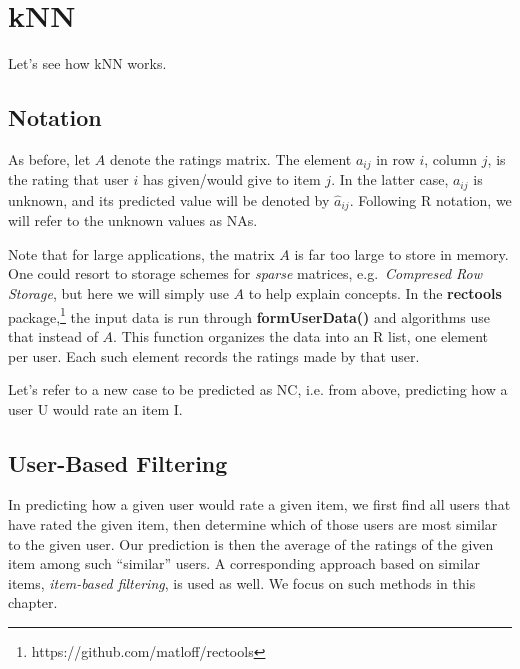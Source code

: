 \section{kNN}

Let's see how kNN works.

\subsection{Notation}

As before, let $A$ denote the ratings matrix.  The element $a_{ij}$ in
row $i$, column $j$, is the rating that user $i$ has given/would give to
item $j$. In the latter case, $a_{ij}$ is unknown, and its predicted value
will be denoted by $\widehat{a}_{ij}$.  Following R notation, we will
refer to the unknown values as NAs.

Note that for large applications, the matrix $A$ is far too large to
store in memory.  One could resort to storage schemes for
\textit{sparse} matrices, e.g.\ \textit{Compresed Row Storage}, but here
we will simply use $A$ to help explain concepts.  In the
\textbf{rectools} package,\footnote{https://github.com/matloff/rectools}
the input data is run through
\textbf{formUserData()} and algorithms use that instead of $A$.  This
function organizes the data into an R list, one element per user.  Each
such element records the ratings made by that user. 

Let's refer to a new case to be predicted as NC, i.e. from above,
predicting how a user U would rate an item I.

\subsection{User-Based Filtering}

In predicting how a given user would rate a given item, we first find
all users that have rated the given item, then determine which of those
users are most similar to the given user.  Our prediction is then the
average of the ratings of the given item among such ``similar'' users.
A corresponding approach based on similar items, \textit{item-based
filtering}, is used as well.  We focus on such methods in this chapter.

% 


